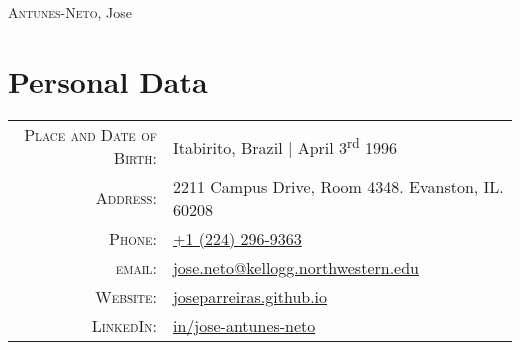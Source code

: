 \documentclass[a4paper,10pt]{article}
\begin{document}
\par{
    \centering
		{\Huge \textsc{Antunes-Neto}, Jose
	}\bigskip\par
}

\section{Personal Data}

\begin{tabular}{rp{9.75cm}}
    \textsc{Place and Date of Birth:} & Itabirito, Brazil  | April 3\textsuperscript{rd}  1996 \\
    \textsc{Address:}   & 2211 Campus Drive, Room 4348. Evanston, IL. 60208\\
    \textsc{Phone:}     & \href{tel:+12242969363}{+1 (224) 296-9363}\\
    \textsc{email:}     & \href{mailto:jose.neto@kellogg.northwestern.edu}{jose.neto@kellogg.northwestern.edu} \\
    \textsc{Website:}   & \href{http://joseparreiras.github.io}{joseparreiras.github.io} \\
    \textsc{LinkedIn:}  & \href{https://www.linkedin.com/in/jose-antunes-neto/}{in/jose-antunes-neto}
\end{tabular}

\end{document}
